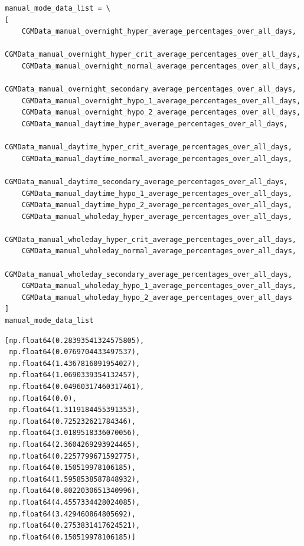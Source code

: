 \begin{verbatim}
manual_mode_data_list = \
[
    CGMData_manual_overnight_hyper_average_percentages_over_all_days,
    CGMData_manual_overnight_hyper_crit_average_percentages_over_all_days,
    CGMData_manual_overnight_normal_average_percentages_over_all_days,
    CGMData_manual_overnight_secondary_average_percentages_over_all_days,
    CGMData_manual_overnight_hypo_1_average_percentages_over_all_days,
    CGMData_manual_overnight_hypo_2_average_percentages_over_all_days,
    CGMData_manual_daytime_hyper_average_percentages_over_all_days,
    CGMData_manual_daytime_hyper_crit_average_percentages_over_all_days,
    CGMData_manual_daytime_normal_average_percentages_over_all_days,
    CGMData_manual_daytime_secondary_average_percentages_over_all_days,
    CGMData_manual_daytime_hypo_1_average_percentages_over_all_days,
    CGMData_manual_daytime_hypo_2_average_percentages_over_all_days,
    CGMData_manual_wholeday_hyper_average_percentages_over_all_days,
    CGMData_manual_wholeday_hyper_crit_average_percentages_over_all_days,
    CGMData_manual_wholeday_normal_average_percentages_over_all_days,
    CGMData_manual_wholeday_secondary_average_percentages_over_all_days,
    CGMData_manual_wholeday_hypo_1_average_percentages_over_all_days,
    CGMData_manual_wholeday_hypo_2_average_percentages_over_all_days
]
manual_mode_data_list
\end{verbatim}

\begin{verbatim}
[np.float64(0.28393541324575805),
 np.float64(0.0769704433497537),
 np.float64(1.4367816091954027),
 np.float64(1.0690339354132457),
 np.float64(0.04960317460317461),
 np.float64(0.0),
 np.float64(1.3119184455391353),
 np.float64(0.725232621784346),
 np.float64(3.0189518336070056),
 np.float64(2.3604269293924465),
 np.float64(0.2257799671592775),
 np.float64(0.150519978106185),
 np.float64(1.5958538587848932),
 np.float64(0.8022030651340996),
 np.float64(4.4557334428024085),
 np.float64(3.429460864805692),
 np.float64(0.2753831417624521),
 np.float64(0.150519978106185)]
\end{verbatim}

